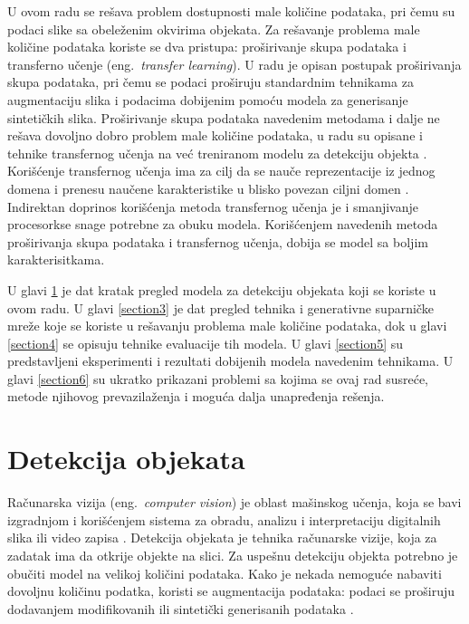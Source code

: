 \documentclass[12pt,oneside]{memoir}
\begin{document}
U ovom radu se rešava problem dostupnosti male količine podataka, pri čemu su podaci slike sa obeleženim okvirima objekata. Za rešavanje problema male količine podataka koriste se dva pristupa: proširivanje skupa podataka i transferno učenje (eng.~\textit{transfer learning}).
U radu je opisan postupak proširivanja skupa podataka, pri čemu se podaci proširuju standardnim tehnikama za augmentaciju slika i podacima dobijenim pomoću modela za generisanje sintetičkih slika. 
Proširivanje skupa podataka navedenim metodama i dalje ne rešava dovoljno dobro problem male količine podataka, u radu su opisane i tehnike transfernog učenja  \cite{zhuang2020comprehensive} na već treniranom modelu za detekciju objekta \cite{bochkovskiy2020yolov4}. 
Korišćenje transfernog učenja ima za cilj da se nauče reprezentacije iz jednog domena i prenesu naučene karakteristike u blisko povezan ciljni domen \cite{brigato2021close, bengio2012deep}.
Indirektan doprinos korišćenja metoda transfernog učenja je i smanjivanje procesorkse snage potrebne za obuku modela.
Korišćenjem navedenih metoda proširivanja skupa podataka i transfernog učenja, dobija se model sa boljim karakterisitkama.


U glavi \ref{section2} je dat kratak pregled modela za detekciju objekata koji se koriste u ovom radu. U glavi \ref{section3} je dat pregled tehnika i generativne suparničke mreže koje se koriste u rešavanju problema male količine podataka, dok u glavi \ref{section4} se opisuju tehnike evaluacije tih modela. U glavi \ref{section5} su predstavljeni eksperimenti i rezultati dobijenih modela navedenim tehnikama. U glavi \ref{section6} su ukratko prikazani problemi sa kojima se ovaj rad susreće, metode njihovog prevazilaženja i moguća dalja unapređenja rešenja.


\chapter{Detekcija objekata}
\label{section2}

Računarska vizija (eng.~\textit{computer vision}) je oblast mašinskog učenja, koja se bavi izgradnjom i korišćenjem  sistema za obradu, analizu i interpretaciju digitalnih slika ili video zapisa \cite{ballard1982computer, huang1996computer}.
Detekcija objekata je tehnika računarske vizije, koja za zadatak ima 
da otkrije objekte na slici. Za uspešnu detekciju objekta potrebno je obučiti model na velikoj količini podataka. 
Kako je nekada nemoguće nabaviti dovoljnu količinu podatka, koristi se augmentacija podataka: podaci se proširuju dodavanjem modifikovanih ili sintetički generisanih podataka \cite{shorten2019survey}. 
\end{document}

